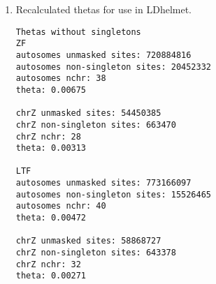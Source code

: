 \documentclass[idxtotoc,hyperref,openany,oneside]{labbook} %
\begin{document}
\begin{enumerate}
\begin{verbatim}
/mnt/lustre/home/sonal.singhal1/bin/shapeit_v2r790/shapeit -assemble --input-vcf /mnt/gluster/home/sonal.singhal1/LTF/after_vqsr/by_chr/for_shapeit/gatk.ug.ltf.chrZ.allfilters.recodedsex.recoded_biallelicSNPs.males.vcf.gz --input-pir /mnt/gluster/home/sonal.singhal1/LTF/phasing/PIR_approach/chrZ_PIRlist -O /mnt/gluster/home/sonal.singhal1/LTF/phasing/PIR_approach/chrZ_haplotypes -L /mnt/gluster/home/sonal.singhal1/LTF/phasing/PIR_approach/chrZ_haplotypes --window 0.5 --thread 8 --rho 0.0008 -R /mnt/gluster/home/sonal.singhal1/LTF/after_vqsr/by_chr/for_shapeit/chrZ.hap.gz /mnt/gluster/home/sonal.singhal1/LTF/after_vqsr/by_chr/for_shapeit/chrZ.legend.gz /mnt/gluster/home/sonal.singhal1/LTF/after_vqsr/by_chr/for_shapeit/chrZ.sample
\end{verbatim}
\item Recalculated thetas for use in LDhelmet.
\begin{verbatim}
Thetas without singletons
ZF
autosomes unmasked sites: 720884816
autosomes non-singleton sites: 20452332
autosomes nchr: 38
theta: 0.00675

chrZ unmasked sites: 54450385
chrZ non-singleton sites: 663470
chrZ nchr: 28
theta: 0.00313

LTF
autosomes unmasked sites: 773166097
autosomes non-singleton sites: 15526465
autosomes nchr: 40
theta: 0.00472

chrZ unmasked sites: 58868727
chrZ non-singleton sites: 643378
chrZ nchr: 32
theta: 0.00271
\end{verbatim}
\end{enumerate}
\end{document}
